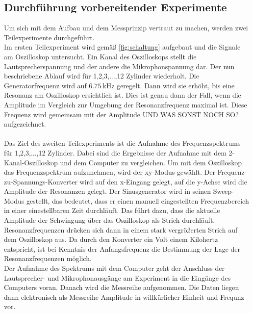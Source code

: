 \subsection{Durchführung vorbereitender Experimente}
\label{subsec:durchfuehrungVorbereitender}
Um sich mit dem Aufbau und dem Messprinzip vertraut zu machen, werden zwei Teilexperimente durchgeführt.\\
Im ersten Teilexperiment wird gemäß \ref{fig:schaltung} aufgebaut und die Signale am Oszilloskop untersucht. Ein Kanal des Oszilloskops stellt die Lautsprecherspannung und der andere die Mikrophonspannung dar. Der nun beschriebene Ablauf wird für 1,2,3,...,12 Zylinder wiederholt. Die Generatorfrequenz wird auf $\SI{6.75}{\kilo\hertz}$ geregelt. Dann wird sie erhöht, bis eine Resonanz am Oszilloskop ersichtlich ist. Dies ist genau dann der Fall, wenn die Amplitude im Vergleich zur Umgebung der Resonanzfrequenz maximal ist. Diese Frequenz wird gemeinsam mit der Amplitude UND WAS SONST NOCH SO? aufgezeichnet.\\\\
Das Ziel des zweiten Teilexperiments ist die Aufnahme des Frequenzspektrums für 1,2,3,...,12 Zylinder. Dabei sind die Ergebnisse der Aufnahme mit dem 2-Kanal-Oszilloskop und dem Computer zu vergleichen. Um mit dem Oszilloskop das Frequenzspektrum aufzunehmen, wird der xy-Modus gewählt. Der Frequenz-zu-Spannungs-Konverter wird auf den x-Eingang gelegt, auf die y-Achse wird die Amplitude der Resonanzen gelegt.
Der Sinusgenerator wird in seinen Sweep-Modus gestellt, das bedeutet, dass er einen manuell eingestellten Frequenzbereich in einer einestellbaren Zeit durchläuft. Das führt dazu, dass die aktuelle Amplitude der Schwingung über das Oszilloskop als Strich durchläuft. Resonanzfrequenzen drücken sich dann in einem stark vergrößerten Strich auf dem Oszilloskop aus. Da durch den Konverter ein Volt einem Kilohertz entspricht, ist bei Kenntnis der Anfangsfrequenz die Bestimmung der Lage der Resonanzfrequenzen möglich.\\
Der Aufnahme des Spektrums mit dem Computer geht der Anschluss der Lautsprecher- und Mikrophonausgänge am Experiment in die Eingänge des Computers voran. Danach wird die Messreihe aufgenommen. Die Daten liegen dann elektronisch als Messreihe Amplitude in willkürlicher Einheit und Frequnz vor.

